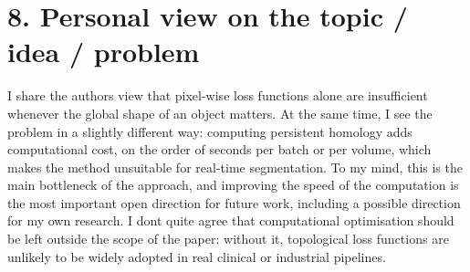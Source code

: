 \documentclass[12pt,a4paper]{article}
\begin{document}
\section*{8. Personal view on the topic / idea / problem}
    I share the authors view that pixel-wise loss functions alone are
    insufficient whenever the global shape of an object matters. At the
    same time, I see the problem in a slightly different way: computing
    persistent homology adds computational cost, on the
    order of seconds per batch or per volume, which makes the method
    unsuitable for real-time segmentation. To my mind, this is the main
    bottleneck of the approach, and improving the speed of the
    computation is the most important open direction for future work,
    including a possible direction for my own research. I dont quite
    agree that computational optimisation should be left outside the
    scope of the paper: without it, topological loss functions are
    unlikely to be widely adopted in real clinical or industrial
    pipelines.
\end{document}

